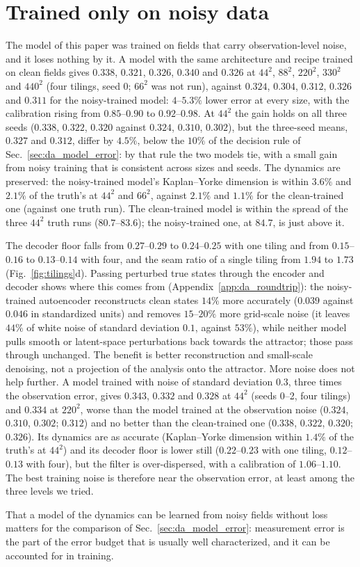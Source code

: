 \section{Trained only on noisy data}
\label{sec:da_noisy}

The model of this paper was trained on fields that carry observation-level
noise, and it loses nothing by it. A model with the same architecture and
recipe trained on clean fields gives $0.338$, $0.321$, $0.326$, $0.340$ and $0.326$ at
$44^2$, $88^2$, $220^2$, $330^2$ and $440^2$ (four tilings, seed 0; $66^2$ was not run), against $0.324$, $0.304$, $0.312$, $0.326$ and $0.311$
for the noisy-trained model: $4$--$5.3\%$ lower error at every size, with the
calibration rising from $0.85$--$0.90$ to $0.92$--$0.98$. At $44^2$ the gain holds on all
three seeds ($0.338$, $0.322$, $0.320$ against $0.324$, $0.310$, $0.302$), but the three-seed means,
$0.327$ and $0.312$, differ by $4.5\%$, below the $10\%$ of the decision rule of
Sec.~\ref{sec:da_model_error}: by that rule the two models tie, with a small gain from noisy
training that is consistent across sizes and seeds. The dynamics are
preserved: the noisy-trained model's Kaplan--Yorke dimension is within
$3.6\%$ and $2.1\%$ of the truth's at $44^2$ and $66^2$, against $2.1\%$ and $1.1\%$ for the
clean-trained one (against one truth run). The clean-trained model is within the
spread of the three $44^2$ truth runs ($80.7$--$83.6$); the noisy-trained one, at $84.7$, is
just above it.

 The decoder floor falls from $0.27$--$0.29$ to $0.24$--$0.25$ with one tiling and
from $0.15$--$0.16$ to $0.13$--$0.14$ with four, and the seam ratio of a single
tiling from $1.94$ to $1.73$ (Fig.~\ref{fig:tilings}d). Passing perturbed true
states through the encoder and decoder shows where this comes from
(Appendix~\ref{app:da_roundtrip}): the noisy-trained autoencoder reconstructs clean
states $14\%$ more accurately ($0.039$ against $0.046$ in standardized units) and
removes $15$--$20\%$ more grid-scale noise (it leaves $44\%$ of white noise of
standard deviation $0.1$, against $53\%$), while neither model pulls smooth or
latent-space perturbations back towards the attractor; those pass through
unchanged. The benefit is better reconstruction and small-scale
denoising, not a projection of the analysis onto the attractor.
More noise does not help further. A model trained with noise of standard
deviation $0.3$, three times the observation error, gives $0.343$, $0.332$ and
$0.328$ at $44^2$ (seeds 0--2, four tilings) and $0.334$ at $220^2$, worse than the
model trained at the observation noise ($0.324$, $0.310$, $0.302$; $0.312$) and no
better than the clean-trained one ($0.338$, $0.322$, $0.320$; $0.326$). Its dynamics
are as accurate (Kaplan--Yorke dimension within $1.4\%$ of the truth's at $44^2$)
and its decoder floor is lower still ($0.22$--$0.23$ with one tiling,
$0.12$--$0.13$ with four), but the filter is over-dispersed, with a calibration
of $1.06$--$1.10$. The best training noise is therefore near the observation
error, at least among the three levels we tried.

That a model of the dynamics can be learned from noisy fields without
loss matters for the comparison of Sec.~\ref{sec:da_model_error}:
measurement error is the part of the error budget that is usually well
characterized, and it can be accounted for in training.

